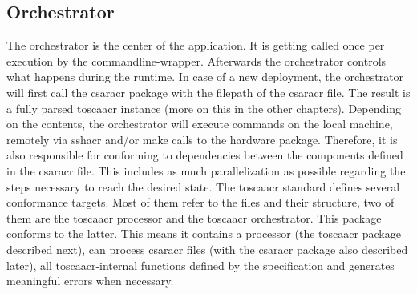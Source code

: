 \subsection{Orchestrator}
The orchestrator is the center of the application. It is getting called once per execution by the commandline-wrapper. Afterwards the orchestrator controls what happens during the runtime. In case of a new deployment, the orchestrator will first call the \gls{csaracr} package with the filepath of the \gls{csaracr} file. The result is a fully parsed \gls{toscaacr} instance (more on this in the other chapters). Depending on the contents, the orchestrator will execute commands on the local machine, remotely via \gls{sshacr} and/or make calls to the hardware package. Therefore, it is also responsible for conforming to dependencies between the components defined in the \gls{csaracr} file. This includes as much parallelization as possible regarding the steps necessary to reach the desired state.
\newline
The \gls{toscaacr} standard defines several conformance targets. Most of them refer to the files and their structure, two of them are the \gls{toscaacr} processor and the \gls{toscaacr} orchestrator. This package conforms to the latter. This means it contains a processor (the \gls{toscaacr} package described next), can process \gls{csaracr} files (with the \gls{csaracr} package also described later), all \gls{toscaacr}-internal functions defined by the specification and generates meaningful errors when necessary.

